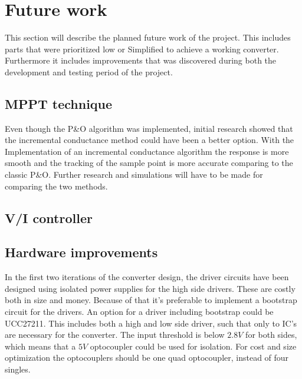 \section{Future work}
This section will describe the planned future work of the project. This includes parts that were prioritized low or Simplified to achieve a working converter. Furthermore it includes improvements that was discovered during both the development and testing period of the project.


\subsection{MPPT technique}
Even though the P\&O algorithm was implemented, initial research showed that the incremental conductance method could have been a better option. With the Implementation of an incremental conductance algorithm the response is more smooth and the tracking of the sample point is more accurate comparing to the classic P\&O. Further research and simulations will have to be made for comparing the two methods. \cite{AdvantageIncC}

\subsection{V/I controller}

\subsection{Hardware improvements}
In the first two iterations of the converter design, the driver circuits have been designed using isolated power supplies for the high side drivers. These are costly both in size and money. Because of that it's preferable to implement a bootstrap circuit for the drivers. An option for a driver including bootstrap could be UCC27211\cite{boot_driver_datasheet}. This includes both a high and low side driver, such that only to IC's are necessary for the converter. The input threshold is below $2.8V$ for both sides, which means that a $5V$ optocoupler could be used for isolation. For cost and size optimization the optocouplers should be one quad optocoupler, instead of four singles. 
 

